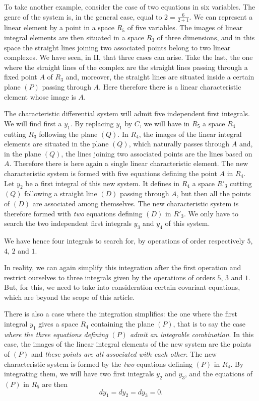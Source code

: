 \documentclass[leqno,11pt]{book}
\theoremstyle{shape1}
\theoremstyle{shapesmall}
\begin{document}
To take another example, consider the case of two equations in six variables. The genre of the system is, in the general case, equal to $2=\frac{6}{2+1}$. We can represent a linear element by a point in a space $R_{5}$ of five variables. The images of linear integral elements are then situated in a space $R_{3}$ of three dimensions, and in this space the straight lines joining two associated points belong to two linear complexes. We have seen, in \textsection II, that three cases can arise. Take the last, the one where the straight lines of the complex are the straight lines passing through a fixed point $A$ of $R_{3}$ and, moreover, the straight lines are situated inside a certain plane $(P)$ passing through $A$. Here therefore there is a linear characteristic element whose image is $A$.

The characteristic differential system will admit five independent first integrals. We will find first a $y_{1}$. By replacing $y_{1}$ by $C$, we will have in $R_{5}$ a space $R_{4}$ cutting $R_{3}$ following the plane $(Q)$. In $R_{4}$, the images of the linear integral elements are situated in the plane $(Q)$, which naturally passes through $A$ and, in the plane $(Q)$, the lines joining two associated points are the lines based on $A$. Therefore there is here again a single linear characteristic element. The new characteristic system is formed with five equations defining the point $A$ in $R_{4}$. Let $y_{2}$ be a first integral of this new system. It defines in $R_{4}$ a space $R'_{3}$ cutting $(Q)$ following a straight line $(D)$ passing through $A$, but then all the points of $(D)$ are associated among themselves. The new characteristic system is therefore formed with \emph{two} equations defining $(D)$ in $R'_{3}$. We only have to search the two independent first integrals $y_{3}$ and $y_{4}$ of this system.

We have hence four integrals to search for, by operations of order respectively $5$, $4$, $2$ and $1$.

In reality, we can again simplify this integration after the first operation and restrict ourselves to three integrals given by the operations of orders $5$, $3$ and $1$. But, for this, we need to take into consideration certain covariant equations, which are beyond the scope of this article.

There is also a case where the integration simplifies: the one where the first integral $y_{1}$ gives a space $R_{4}$ containing the plane $(P)$, that is to say the case \emph{where the three equations defining $(P)$ admit an integrable combination}. In this case, the images of the linear integral elements of the new system are the points of $(P)$ and \emph{these points are all associated with each other}. The new characteristic system is formed by the \emph{two} equations defining $(P)$ in $R_{4}$. By integrating them, we will have two first integrals $y_{2}$ and $y_{3}$, and the equations of $(P)$ in $R_{5}$ are then
\[
dy_{1}=dy_{2}=dy_{3}=0.
\]
\end{document}
